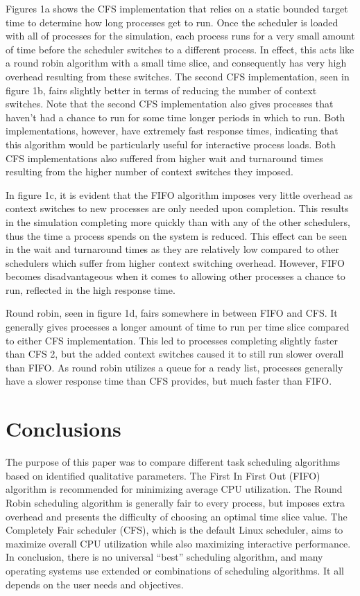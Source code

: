 \documentclass[a4paper]{article}
\begin{document}
Figures 1a shows the CFS implementation that relies on a static bounded target time to determine how long processes get to run. Once the scheduler is loaded with all of processes for the simulation, each process runs for a very small amount of time before the scheduler switches to a different process. In effect, this acts like a round robin algorithm with a small time slice, and consequently has very high overhead resulting from these switches. The second CFS implementation, seen in figure 1b, fairs slightly better in terms of reducing the number of context switches. Note that the second CFS implementation also gives processes that haven’t had a chance to run for some time longer periods in which to run. Both implementations, however, have extremely fast response times, indicating that this algorithm would be particularly useful for interactive process loads. Both CFS implementations also suffered from higher wait and turnaround times resulting from the higher number of context switches they imposed.


In figure 1c, it is evident that the FIFO algorithm imposes very little overhead as context switches to new processes are only needed upon completion. This results in the simulation completing more quickly than with any of the other schedulers, thus the time a process spends on the system is reduced. This effect can be seen in the wait and turnaround times as they are relatively low compared to other schedulers which suffer from higher context switching overhead. However, FIFO becomes disadvantageous when it comes to allowing other processes a chance to run, reflected in the high response time.


Round robin, seen in figure 1d, fairs somewhere in between FIFO and CFS. It generally gives processes a longer amount of time to run per time slice compared to either CFS implementation. This led to processes completing slightly faster than CFS 2, but the added context switches caused it to still run slower overall than FIFO. As round robin utilizes a queue for a ready list, processes generally have a slower response time than CFS provides, but much faster than FIFO.

\section{Conclusions}
\label{sec:con}
The purpose of this paper was to compare different task scheduling algorithms based on identified qualitative parameters. The First In First Out (FIFO) algorithm is recommended for minimizing average CPU utilization. The Round Robin scheduling algorithm is generally fair to every process, but imposes extra overhead and presents the difficulty of choosing an optimal time slice value. The Completely Fair scheduler (CFS), which is the default Linux scheduler, aims to maximize overall CPU utilization while also maximizing interactive performance. In conclusion, there is no universal “best” scheduling algorithm, and many operating systems use extended or combinations of scheduling algorithms. It all depends on the user needs and objectives.
\end{document}
